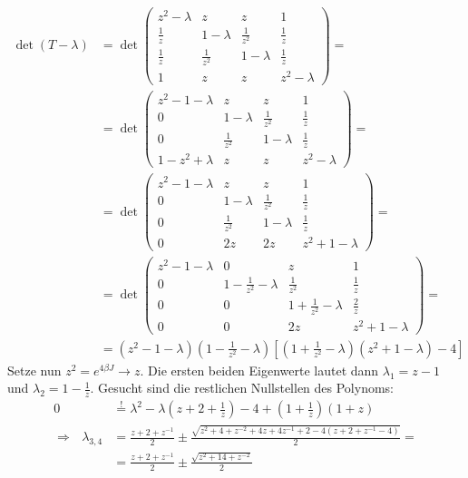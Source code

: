 \documentclass[a4paper,12pt]{article}
\newcommand{\kla}{}
\newcommand{\klam}{}
\begin{document}
\begin{align*}
\det (T-\lambda)&=\det\begin{pmatrix}
z^2-\lambda&z&z&1\\
\frac{1}{z}&1-\lambda&\frac{1}{z^2}&\frac{1}{z}\\
\frac{1}{z}&\frac{1}{z^2}&1-\lambda&\frac{1}{z}\\
1&z&z&z^2-\lambda
\end{pmatrix}=\\
&=\det\begin{pmatrix}
z^2-1-\lambda&z&z&1\\
0&1-\lambda&\frac{1}{z^2}&\frac{1}{z}\\
0&\frac{1}{z^2}&1-\lambda&\frac{1}{z}\\
1-z^2+\lambda&z&z&z^2-\lambda
\end{pmatrix}=\\
&=\det\begin{pmatrix}
z^2-1-\lambda&z&z&1\\
0&1-\lambda&\frac{1}{z^2}&\frac{1}{z}\\
0&\frac{1}{z^2}&1-\lambda&\frac{1}{z}\\
0&2z&2z&z^2+1-\lambda
\end{pmatrix}=\\
&=\det\begin{pmatrix}
z^2-1-\lambda&0&z&1\\
0&1-\frac{1}{z^2}-\lambda&\frac{1}{z^2}&\frac{1}{z}\\
0&0&1+\frac{1}{z^2}-\lambda&\frac{2}{z}\\
0&0&2z&z^2+1-\lambda
\end{pmatrix}=\\
&=\kla\left( {z^2-1-\lambda} \right)\kla\left( {1-\frac{1}{z^2}-\lambda} \right)\klam\left[ {\kla\left( {1+\frac{1}{z^2}-\lambda} \right)(z^2+1-\lambda)-4} \right]
\end{align*}
Setze nun $z^2=e^{4\beta J}\rightarrow z$. Die ersten beiden Eigenwerte lautet dann $\lambda_1=z-1$ und $\lambda_2=1-\frac{1}{z}$. Gesucht sind die restlichen Nullstellen des Polynoms:
\begin{align*}
0&\overset{!}{=}\lambda^2-\lambda\kla\left( {z+2+\frac{1}{z}} \right)-4+\kla\left( {1+\frac{1}{z}} \right)\kla\left( {1+z} \right)\\
\Rightarrow\ \ \ \lambda_{3,4}&=\frac{z+2+z^{-1}}{2}\pm\frac{\sqrt{z^2+4+z^{-2}+4z+4z^{-1}+2-4\kla\left( {z+2+ z^{-1}-4} \right)}}{2}=\\
&=\frac{z+2+z^{-1}}{2}\pm\frac{\sqrt{z^2+14+z^{-2}}}{2}
\end{align*}
\end{document}
